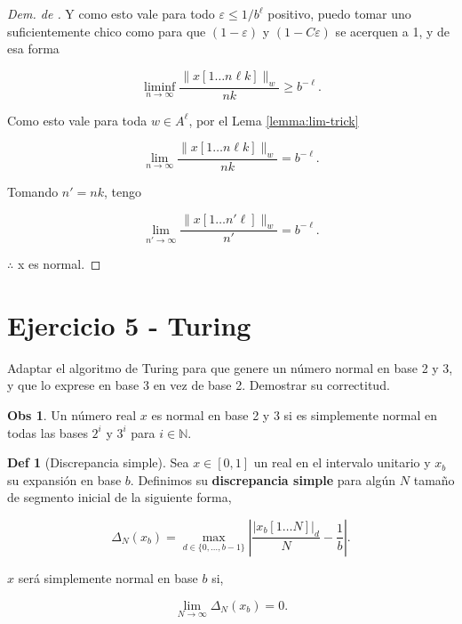 \documentclass{article}
\theoremstyle{definition} %
\newtheorem*{definition*}{Def}
\newtheorem*{observation*}{Obs}
\begin{document}
\begin{proof}[Dem. de ]
    Y como esto vale para todo $\varepsilon \leq 1/b^\ell$ positivo, puedo tomar
    uno suficientemente chico como para que $(1 - \varepsilon)$ y $(1 -
    C\varepsilon)$ se acerquen a 1, y de esa forma

    \[
        \liminf_{n\to \infty} \frac{\|x[1\dots n\ell k]\|_w}{nk}
        \geq b^{-\ell}.
    \]

    Como esto vale para toda $w \in A^\ell$, por el Lema \ref{lemma:lim-trick}
    
    \[
        \lim_{n\to \infty} \frac{\|x[1\dots n\ell k]\|_w}{nk}
        = b^{-\ell}.
    \]

    Tomando $n' = nk$, tengo

    \[
        \lim_{n'\to \infty} \frac{\|x[1\dots n'\ell]\|_w}{n'}
        = b^{-\ell}.
    \]

    $\therefore$ x es normal.
\end{proof}


\section*{Ejercicio 5 - Turing}

Adaptar el algoritmo de Turing para que genere un número normal en base 2 y 3, y
que lo exprese en base 3 en vez de base 2. Demostrar su correctitud.

\begin{observation*}
    Un número real $x$ es normal en base 2 y 3 si es simplemente normal en todas
    las bases $2^i$ y $3^i$ para $i \in \mathbb{N}$.
\end{observation*}

\begin{definition*}[Discrepancia simple]
    Sea $x \in [0, 1]$ un real en el intervalo unitario y $x_b$ su expansión en
    base $b$. Definimos su \textbf{discrepancia simple} para algún $N$ tamaño de
    segmento inicial de la siguiente forma,

    \[
        \Delta_N(x_b) = \max_{d \in \{ 0, \dots, b-1 \}}
        \left|
            \frac{|x_b[1\dots N]|_d}{N} - \frac{1}{b}
        \right|.
    \]

    $x$ será simplemente normal en base $b$ si,

    \[
        \lim_{N\to \infty} \Delta_N(x_b) = 0.
    \]
\end{definition*}
\end{document}
